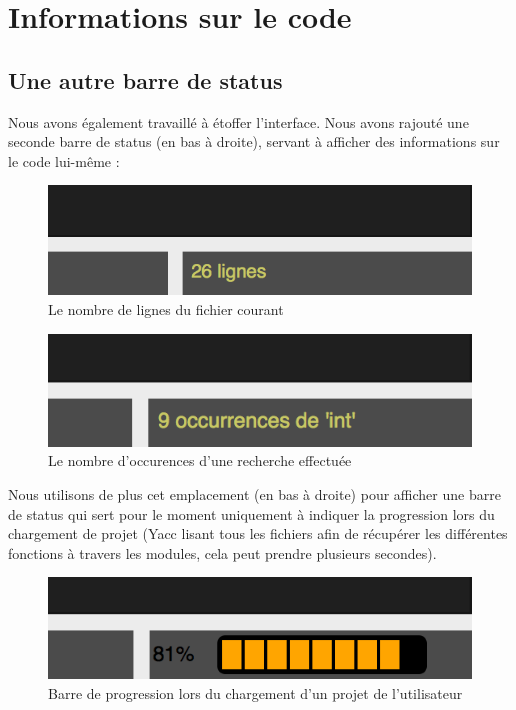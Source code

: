\documentclass[a4paper,12pt]{article}
\begin{document}
\section{Informations sur le code}

	\subsection{Une autre barre de status}
	
		Nous avons également travaillé à étoffer l'interface. Nous avons rajouté une seconde barre de status (en bas à droite), servant à afficher des informations sur le code lui-même :
		
		\begin{figure}[h!]
			\begin{center}
				\includegraphics[scale=1]{images/imgs_themes/nb_lignes}
				\caption{Le nombre de lignes du fichier courant}
			\end{center}
		\end{figure}
		\begin{figure}[h!]
			\begin{center}
				\includegraphics[scale=1]{images/imgs_themes/nb_occu}
				\caption{Le nombre d'occurences d'une recherche effectuée}
			\end{center}
		\end{figure}
		
		Nous utilisons de plus cet emplacement (en bas à droite) pour afficher une barre de status qui sert pour le moment uniquement à indiquer la progression lors du chargement de projet (Yacc lisant tous les fichiers afin de récupérer les différentes fonctions à travers les modules, cela peut prendre plusieurs secondes).
		\begin{figure}[h!]
			\begin{center}
				\includegraphics[scale=1]{images/imgs_themes/progress}
				\caption{Barre de progression lors du chargement d'un projet de l'utilisateur}
			\end{center}
		\end{figure}
		
\end{document}
